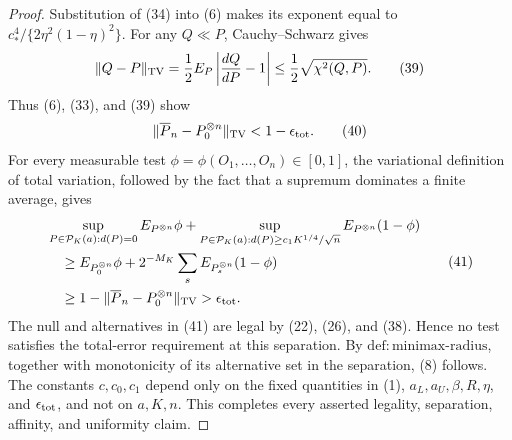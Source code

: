 \documentclass{article}
\begin{document}
\begin{proof}
Substitution of (34) into (6) makes its exponent equal to \(c_*^4/\{2\eta^2(1-\eta)^2\}\).  For any \(Q\ll P\), Cauchy--Schwarz gives
\[
\|Q-P\|_{\rm TV}
=\frac12E_P\left|\frac{dQ}{dP}-1\right|
\le\frac12\sqrt{\chi^2(Q,P)}.
\tag{39}
\]
Thus (6), (33), and (39) show
\[
\|\overline P_n-P_0^{\otimes n}\|_{\rm TV}<1-\epsilon_{\rm tot}.
\tag{40}
\]
For every measurable test \(\phi=\phi(O_1,\ldots,O_n)\in[0,1]\), the variational definition of total variation, followed by the fact that a supremum dominates a finite average, gives
\[
\begin{aligned}
&\sup_{P\in\mathcal P_K(a):d(P)=0}E_{P^{\otimes n}}\phi
+\sup_{P\in\mathcal P_K(a):d(P)\ge c_1K^{1/4}/\sqrt n}
 E_{P^{\otimes n}}(1-\phi) \\
&\quad\ge
E_{P_0^{\otimes n}}\phi
+2^{-M_K}\sum_sE_{P_s^{\otimes n}}(1-\phi) \\
&\quad\ge1-\|\overline P_n-P_0^{\otimes n}\|_{\rm TV}
>\epsilon_{\rm tot}.
\end{aligned}
\tag{41}
\]
The null and alternatives in (41) are legal by (22), (26), and (38).  Hence no test satisfies the total-error requirement at this separation.  By \(\mathrm{def:minimax\mbox{-}radius}\), together with monotonicity of its alternative set in the separation, (8) follows.  The constants \(c,c_0,c_1\) depend only on the fixed quantities in (1), \(a_L,a_U,\beta,R,\eta\), and \(\epsilon_{\rm tot}\), and not on \(a,K,n\).  This completes every asserted legality, separation, affinity, and uniformity claim.
\end{proof}
\end{document}
